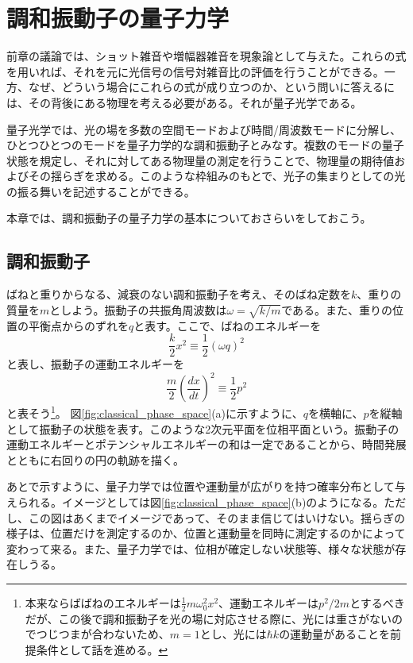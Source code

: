 \chapter{調和振動子の量子力学}

前章の議論では、ショット雑音や増幅器雑音を現象論として与えた。これらの式を用いれば、それを元に光信号の信号対雑音比の評価を行うことができる。一方、なぜ、どういう場合にこれらの式が成り立つのか、という問いに答えるには、その背後にある物理を考える必要がある。それが量子光学である。
	
量子光学では、光の場を多数の空間モードおよび時間/周波数モードに分解し、ひとつひとつのモードを量子力学的な調和振動子とみなす。複数のモードの量子状態を規定し、それに対してある物理量の測定を行うことで、物理量の期待値およびその揺らぎを求める。このような枠組みのもとで、光子の集まりとしての光の振る舞いを記述することができる。

本章では、調和振動子の量子力学の基本についておさらいをしておこう。


\section{調和振動子}
ばねと重りからなる、減衰のない調和振動子を考え、そのばね定数を$k$、重りの質量を$m$としよう。振動子の共振角周波数は$\omega = \sqrt{k/m}$である。また、重りの位置の平衡点からのずれを$q$と表す。ここで、ばねのエネルギーを
\begin{equation}
	\frac{k}{2}x^2 \equiv \frac{1}{2}(\omega q)^2
\end{equation}
と表し、振動子の運動エネルギーを
\begin{equation}
	\frac{m}{2}\left(\frac{dx}{dt}\right)^2\equiv\frac{1}{2}p^2
\end{equation}
と表そう\footnote{本来ならばばねのエネルギーは$\frac 1 2 m\omega_0^2 x^2$、運動エネルギーは$p^2/2m$とするべきだが、この後で調和振動子を光の場に対応させる際に、光には重さがないのでつじつまが合わないため、$m = 1$とし、光には$\hbar k$の運動量があることを前提条件として話を進める。}。
図\ref{fig:classical_phase_space}(a)に示すように、$q$を横軸に、$p$を縦軸として振動子の状態を表す。このような2次元平面を位相平面という。振動子の運動エネルギーとポテンシャルエネルギーの和は一定であることから、時間発展とともに右回りの円の軌跡を描く。

あとで示すように、量子力学では位置や運動量が広がりを持つ確率分布として与えられる。イメージとしては図\ref{fig:classical_phase_space}(b)のようになる。ただし、この図はあくまでイメージであって、そのまま信じてはいけない。揺らぎの様子は、位置だけを測定するのか、位置と運動量を同時に測定するのかによって変わって来る。また、量子力学では、位相が確定しない状態等、様々な状態が存在しうる。

